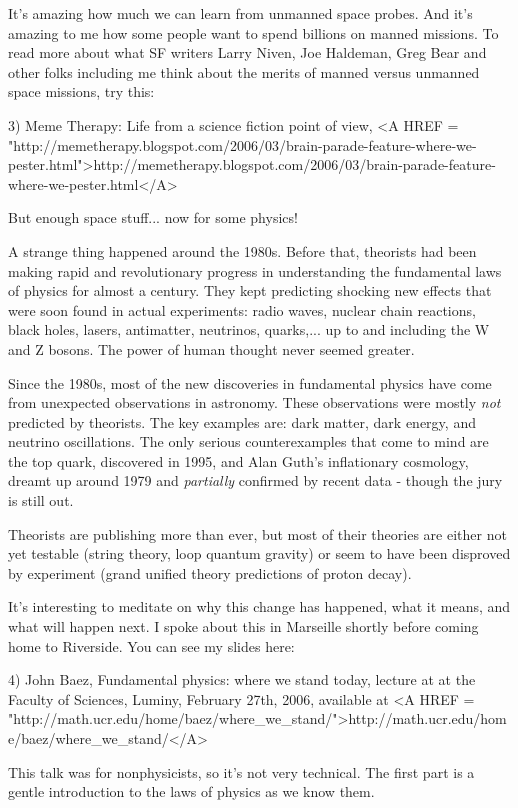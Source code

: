 It's amazing how much we can learn from unmanned space probes.   And
it's amazing to me how some people want to spend billions on manned
missions.  To read more about what SF writers Larry Niven, Joe Haldeman, 
Greg Bear and other folks including me think about the merits of manned 
versus unmanned space missions, try this:

3) Meme Therapy: Life from a science fiction point of view, 
<A HREF = "http://memetherapy.blogspot.com/2006/03/brain-parade-feature-where-we-pester.html">http://memetherapy.blogspot.com/2006/03/brain-parade-feature-where-we-pester.html</A>

But enough space stuff... now for some physics!

A strange thing happened around the 1980s.  Before that, theorists
had been making rapid and revolutionary progress in understanding 
the fundamental laws of physics for almost a century.  They kept
predicting shocking new effects that were soon found in actual
experiments: radio waves, nuclear chain reactions, black holes, 
lasers, antimatter, neutrinos, quarks,... up to and including the 
W and Z bosons.  The power of human thought never seemed greater.

Since the 1980s, most of the new discoveries in fundamental physics 
have come from unexpected observations in astronomy.  These observations
were mostly \emph{not} predicted by theorists.  The key examples are: 
dark matter, dark energy, and neutrino oscillations.  The only serious 
counterexamples that come to mind are the top quark, discovered in 
1995, and Alan Guth's inflationary cosmology, dreamt up around 1979
and \emph{partially} confirmed by recent data - though the jury is still 
out.  

Theorists are publishing more than ever, but most of their theories 
are either not yet testable (string theory, loop quantum gravity) or 
seem to have been disproved by experiment (grand unified theory 
predictions of proton decay).

It's interesting to meditate on why this change has happened, what 
it means, and what will happen next.  I spoke about this in Marseille 
shortly before coming home to Riverside.  You can see my slides here:

4) John Baez, Fundamental physics: where we stand today, lecture at
at the Faculty of Sciences, Luminy, February 27th, 2006, available
at <A HREF = "http://math.ucr.edu/home/baez/where_we_stand/">http://math.ucr.edu/home/baez/where_we_stand/</A>

This talk was for nonphysicists, so it's not very technical.  The first
part is a gentle introduction to the laws of physics as we know them.


